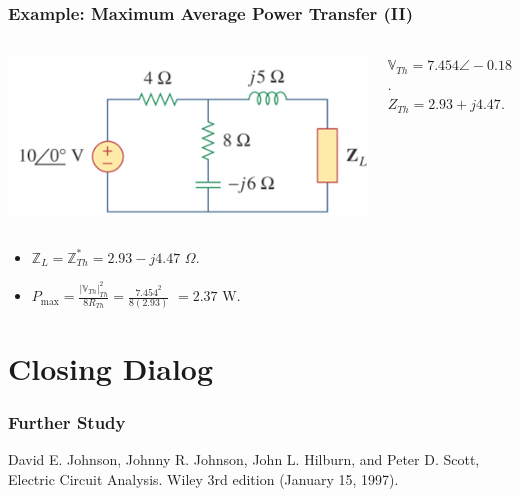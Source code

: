 \documentclass{beamer}
\begin{document}
\begin{frame}[fragile]
\frametitle{Example: Maximum Average Power Transfer (II)}

\begin{columns}[c]
\includegraphics[width=\textwidth]{src/example_max1.png}

$\mathbb{V}_{Th} = 7.454 \angle -0.18$.
\\
$Z_{Th} = 2.93+j4.47$.

\end{columns}

\begin{itemize}
\item $\mathbb{Z}_L = \mathbb{Z}_{Th}^\ast = 2.93 - j4.47$ $\Omega$.
\item $P_{\max} = \frac{|\mathbb{V}_{Th}|_{Th}^2}{8 R_{Th}} = \frac{7.454^2}{8(2.93)}$
$= 2.37$ W.
\end{itemize}


\end{frame}


\section{Closing Dialog}

\begin{frame}[fragile]
\frametitle{Further Study}

David E. Johnson, Johnny R. Johnson, John L. Hilburn, and Peter D. Scott, Electric Circuit Analysis.  Wiley 3rd edition (January 15, 1997).
    
\end{frame}
\end{document}
